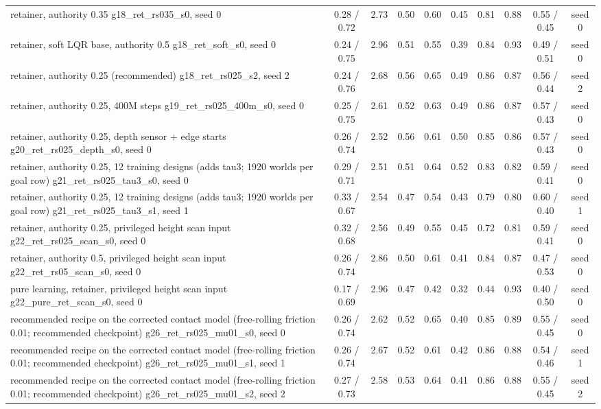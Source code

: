 \begin{table}[t]
{\begin{tabular}{lccccccccc}
retainer, authority 0.35 g18\_ret\_rs035\_s0, seed 0 & 0.28 / 0.72 & 2.73 & 0.50 & 0.60 & 0.45 & 0.81 & 0.88 & 0.55 / 0.45 & seed 0\\
retainer, soft LQR base, authority 0.5 g18\_ret\_soft\_s0, seed 0 & 0.24 / 0.75 & 2.96 & 0.51 & 0.55 & 0.39 & 0.84 & 0.93 & 0.49 / 0.51 & seed 0\\
retainer, authority 0.25 (recommended) g18\_ret\_rs025\_s2, seed 2 & 0.24 / 0.76 & 2.68 & 0.56 & 0.65 & 0.49 & 0.86 & 0.87 & 0.56 / 0.44 & seed 2\\
retainer, authority 0.25, 400M steps g19\_ret\_rs025\_400m\_s0, seed 0 & 0.25 / 0.75 & 2.61 & 0.52 & 0.63 & 0.49 & 0.86 & 0.87 & 0.57 / 0.43 & seed 0\\
retainer, authority 0.25, depth sensor + edge starts g20\_ret\_rs025\_depth\_s0, seed 0 & 0.26 / 0.74 & 2.52 & 0.56 & 0.61 & 0.50 & 0.85 & 0.86 & 0.57 / 0.43 & seed 0\\
retainer, authority 0.25, 12 training designs (adds tau3; 1920 worlds per goal row) g21\_ret\_rs025\_tau3\_s0, seed 0 & 0.29 / 0.71 & 2.51 & 0.51 & 0.64 & 0.52 & 0.83 & 0.82 & 0.59 / 0.41 & seed 0\\
retainer, authority 0.25, 12 training designs (adds tau3; 1920 worlds per goal row) g21\_ret\_rs025\_tau3\_s1, seed 1 & 0.33 / 0.67 & 2.54 & 0.47 & 0.54 & 0.43 & 0.79 & 0.80 & 0.60 / 0.40 & seed 1\\
retainer, authority 0.25, privileged height scan input g22\_ret\_rs025\_scan\_s0, seed 0 & 0.32 / 0.68 & 2.56 & 0.49 & 0.55 & 0.45 & 0.72 & 0.81 & 0.59 / 0.41 & seed 0\\
retainer, authority 0.5, privileged height scan input g22\_ret\_rs05\_scan\_s0, seed 0 & 0.26 / 0.74 & 2.86 & 0.50 & 0.61 & 0.41 & 0.84 & 0.87 & 0.47 / 0.53 & seed 0\\
pure learning, retainer, privileged height scan input g22\_pure\_ret\_scan\_s0, seed 0 & 0.17 / 0.69 & 2.96 & 0.47 & 0.42 & 0.32 & 0.44 & 0.93 & 0.40 / 0.50 & seed 0\\
recommended recipe on the corrected contact model (free-rolling friction 0.01; recommended checkpoint) g26\_ret\_rs025\_mu01\_s0, seed 0 & 0.26 / 0.74 & 2.62 & 0.52 & 0.65 & 0.40 & 0.85 & 0.89 & 0.55 / 0.45 & seed 0\\
recommended recipe on the corrected contact model (free-rolling friction 0.01; recommended checkpoint) g26\_ret\_rs025\_mu01\_s1, seed 1 & 0.26 / 0.74 & 2.67 & 0.52 & 0.61 & 0.42 & 0.86 & 0.88 & 0.54 / 0.46 & seed 1\\
recommended recipe on the corrected contact model (free-rolling friction 0.01; recommended checkpoint) g26\_ret\_rs025\_mu01\_s2, seed 2 & 0.27 / 0.73 & 2.58 & 0.53 & 0.64 & 0.41 & 0.86 & 0.88 & 0.55 / 0.45 & seed 2\\

\end{tabular}}
\end{table}
